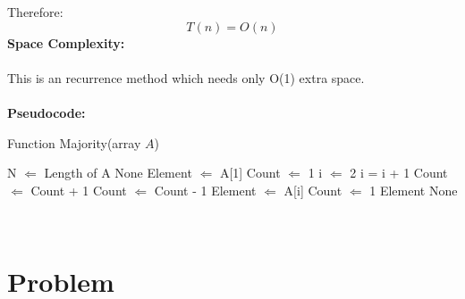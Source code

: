 \documentclass{article}
\begin{document}
Therefore:
$$
T(n)=O (n)
$$
\textbf{\large Space Complexity:}\\\\
This is an recurrence method which needs only O(1) extra space.\\\\
\textbf{\large Pseudocode:}
\begin{algorithm}
  \caption{Function Majority(array $A$)}
  \label{alg1}
  \begin{algorithmic}
  \STATE N $\Longleftarrow$ Length of A
  \RETURN None
  \ENDIF 
  \STATE Element $\Longleftarrow$ A[1]
  \STATE Count $\Longleftarrow$ 1
  \STATE i $\Longleftarrow$ 2
  \STATE i = i + 1
  \STATE Count $\Longleftarrow$ Count + 1
  \STATE Count $\Longleftarrow$ Count - 1
  \STATE Element $\Longleftarrow$ A[i]
  \STATE Count $\Longleftarrow$ 1
  \ENDIF
  \ENDFOR
  \RETURN Element
  \ELSE
  \RETURN None
  \ENDIF
  \end{algorithmic}
\end{algorithm}\\







\section{Problem \uppercase\expandafter{}}
\end{document}
